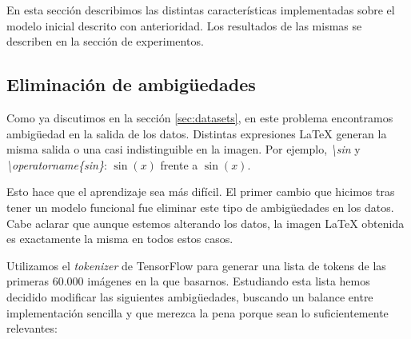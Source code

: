 \documentclass[a4paper, 20pt, dvipsnames]{article}
\begin{document}

En esta sección describimos las distintas características implementadas sobre el
modelo inicial descrito con anterioridad. Los resultados de las mismas se
describen en la sección de experimentos.


\subsection{Eliminación de ambigüedades}
\label{feature:rem-amb}

Como ya discutimos en la sección \ref{sec:datasets}, en este problema
encontramos ambigüedad en la salida de los datos. Distintas expresiones \LaTeX{}
generan la misma salida o una casi indistinguible en la imagen. Por ejemplo,
\emph{\textbackslash sin} y \emph{\textbackslash operatorname\{sin\}}: $\sin(x)$
frente a $\operatorname{sin}(x)$.

Esto hace que el aprendizaje sea más difícil. El primer cambio que hicimos tras
tener un modelo funcional fue eliminar este tipo de ambigüedades en los
datos. Cabe aclarar que aunque estemos alterando los datos, la imagen \LaTeX{}
obtenida es exactamente la misma en todos estos casos.

Utilizamos el \emph{tokenizer} de TensorFlow \cite{tokenizer} para generar una
lista de tokens de las primeras 60.000 imágenes en la que basarnos. Estudiando
esta lista hemos decidido modificar las siguientes ambigüedades, buscando un
balance entre implementación sencilla y que merezca la pena porque sean lo
suficientemente relevantes:
\end{document}
